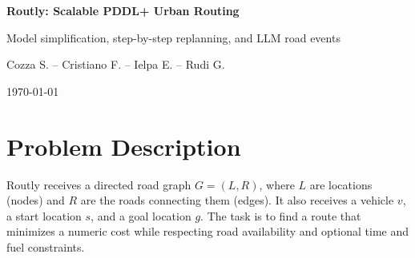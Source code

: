\documentclass[10pt]{article}
\begin{document}
\begin{center}
  {\LARGE\bfseries Routly: Scalable PDDL+ Urban Routing\par}
  \vspace{0.20em}
  {\large Model simplification, step-by-step replanning, and LLM road events\par}
  \vspace{0.65em}
  {\normalsize Cozza S. -- Cristiano F. -- Ielpa E. -- Rudi G.\par}
  \vspace{0.45em}
  {\normalsize \today\par}
\end{center}
\vspace{-0.35em}

\begin{abstract}
Routly is a framework for urban route planning over real OpenStreetMap networks. It downloads a city's road map using OSMnx, ENHSP solves a PDDL-based problem and SUMO visualizes the resulting route in a traffic simulation. The model can include traffic that slows roads down, traffic lights, closed roads, and fuel limits. These features make the routes more realistic, but they also increase the computational cost of planning. Routly studies two different scalability strategies. The \emph{model-side} branch improves scalability by simplifying the planning model before it is given to the planner. The \emph{controller-side} branch keeps the
detailed PDDL+ process model but solves the trip in smaller pieces and joins them, for congestion or for fuel. A separate LLM layer generates structured road closures and slowdowns using topology and start/goal information, without ever seeing the planned route; a second planning run then measures how well the route adapts. All modelling choices and experimental parameters are recorded through validated YAML configuration snapshots.
\end{abstract}
\vspace{-0.35em}

\section{Problem Description}

Routly receives a directed road graph $G=(L,R)$, where $L$ are locations (nodes) and $R$ are the roads connecting
them (edges). It also receives a vehicle $v$, a start location $s$, and a goal location
$g$. The task is to find a route that minimizes a numeric cost while
respecting road availability and optional time and fuel constraints.
\end{document}
